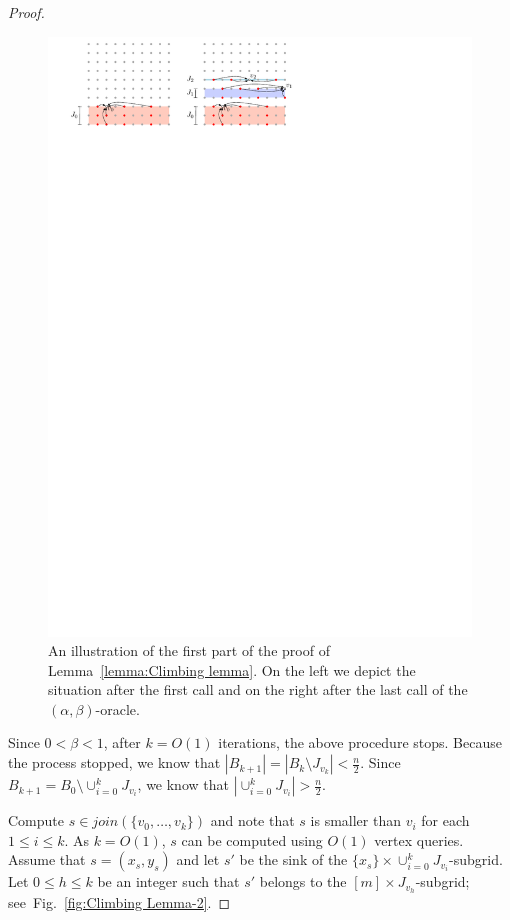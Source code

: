 \documentclass[runningheads,a4paper]{llncs}
\begin{document}
\begin{proof}
\begin{figure}[bh]
\centering
\includegraphics{ClimbingLemma.pdf}
\caption{\small An illustration of the first part of the proof of Lemma~\ref{lemma:Climbing lemma}. On the left we depict the situation after the first call and on the right after the last call of the $(\alpha, \beta)$-oracle.}
\label{fig:Climbing Lemma}
\end{figure}

Since $0 < \beta < 1$, after $k = O(1)$ iterations, the above procedure stops. 
Because the process stopped, we know that $|B_{k+1}| = |B_k \setminus J_{v_k}| <  \frac{n}{2}$.
Since $B_{k+1} = B_0\setminus \cup_{i=0}^k J_{v_i}$, we know that $|\cup_{i=0}^k J_{v_i}| >  \frac{n}{2}$.

Compute $s \in join(\{v_0, \ldots, v_k\})$ and note that $s$ is smaller than $v_i$ for each $1\leq i\leq k$. As $k = O(1)$, $s$ can be computed using $O(1)$ vertex queries. 
Assume that $s = (x_s, y_s)$ and let $s'$ be the sink of the $\{x_s\}\times \cup_{i=0}^k J_{v_i}$-subgrid. 
Let $0\leq h\leq k$ be an integer such that $s'$ belongs to the $[m]\times J_{v_h}$-subgrid; see~Fig.~\ref{fig:Climbing Lemma-2}.


\end{proof}
\end{document}
